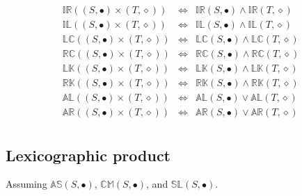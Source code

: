 \documentclass[10pt]{report}
\newcommand{\propname}[1]{{\mathbb{#1}}}
\begin{document}
\[\begin{array}{rcl}
\propname{IR}((S, \bullet) \times (T, \diamond)) 
   & \Leftrightarrow %
   & \propname{IR}(S, \bullet) \wedge  \propname{IR}(T, \diamond) \\ 
\propname{IL}((S, \bullet) \times (T, \diamond)) 
   & \Leftrightarrow %
   & \propname{IL}(S, \bullet) \wedge  \propname{IL}(T, \diamond) \\ 
\propname{LC}((S, \bullet) \times (T, \diamond)) 
   & \Leftrightarrow %
   & \propname{LC}(S, \bullet) \wedge  \propname{LC}(T, \diamond) \\ 
\propname{RC}((S, \bullet) \times (T, \diamond)) 
   & \Leftrightarrow %
   & \propname{RC}(S, \bullet) \wedge  \propname{RC}(T, \diamond) \\ 
\propname{LK}((S, \bullet) \times (T, \diamond)) 
   & \Leftrightarrow %
   & \propname{LK}(S, \bullet) \wedge  \propname{LK}(T, \diamond) \\ 
\propname{RK}((S, \bullet) \times (T, \diamond)) 
   & \Leftrightarrow %
   & \propname{RK}(S, \bullet) \wedge  \propname{RK}(T, \diamond) \\ 
\propname{AL}((S, \bullet) \times (T, \diamond)) 
   & \Leftrightarrow %
   &  \propname{AL}(S, \bullet) \vee  \propname{AL}(T, \diamond) \\ 
\propname{AR}((S, \bullet) \times (T, \diamond))  
   & \Leftrightarrow %
   & \propname{AR}(S, \bullet) \vee  \propname{AR}(T, \diamond) \\ 
\end{array} 
\] 

\subsection{Lexicographic product} 

Assuming 
$\propname{AS}(S, \bullet)$, 
$\propname{CM}(S, \bullet)$,  and 
$\propname{SL}(S, \bullet)$. 
\end{document}
